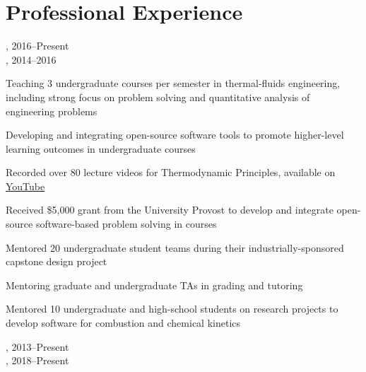 \section{{\sectionfont{} Professional Experience}}

,  \hfill 2016--Present\\
,  \hfill 2014--2016

\begin{innerlist}
    \item Teaching 3 undergraduate courses per semester in thermal-fluids engineering, including strong focus on problem solving and quantitative analysis of engineering problems
    \item Developing and integrating open-source software tools to promote higher-level learning outcomes in undergraduate courses
    \item Recorded over 80 lecture videos for Thermodynamic Principles, available on \href{https://www.youtube.com/playlist?list=PLnOxmF4n89SXsKxFb6ug0ThMNpqJST5_X}{YouTube}
    \item Received \$5,000 grant from the University Provost to develop and integrate open-source software-based problem solving in courses
    \item Mentored 20 undergraduate student teams during their industrially-sponsored capstone design project
    \item Mentoring graduate and undergraduate TAs in grading and tutoring
    \item Mentored 10 undergraduate and high-school students on research projects to develop software for combustion and chemical kinetics
\end{innerlist}

\vspace{\baselineskip}

, \href{https://github.com/Cantera/cantera}{} \hfill 2013--Present\\
,  \hfill 2018--Present

